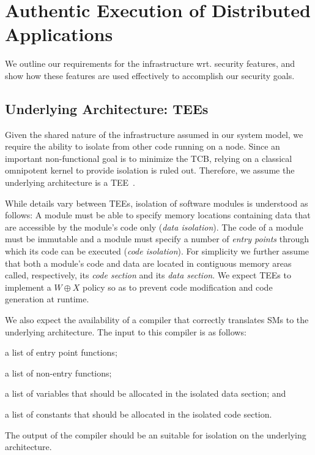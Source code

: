 \section{Authentic Execution of Distributed Applications}
\label{sec:design}

We outline our requirements for the infrastructure wrt. security features,
and show how these features are used effectively to accomplish our security
goals.

\subsection{Underlying Architecture: TEEs}
\label{design:tee}
%
Given the shared nature of the infrastructure assumed in our system model, we
require the ability to isolate \reactmods{} from other code running on a node.
Since an important non-functional goal is to minimize the \ac{TCB}, relying on a
classical omnipotent kernel to provide isolation is ruled out. Therefore, we
assume the underlying architecture is a \ac{TEE}~\cite{pma}.

\label{concept:isolation} While details vary between \acp{TEE}, isolation
of software modules is understood as follows: A module must be able to
specify memory locations containing data that are accessible by the
module's code only (\emph{data isolation}).  The code of a module must be
immutable and a module must specify a number of \emph{entry points} through
which its code can be executed (\emph{code isolation}).  For simplicity we
further assume that both a module's code and data are located in contiguous
memory areas called, respectively, its \emph{code section} and its
\emph{data section}. We expect \acp{TEE} to implement a $W\oplus X$ policy
so as to prevent code modification and code generation at runtime.

\label{concept:pma-compiler} We also expect the availability of a compiler
that correctly translates \acfp{SM} to the underlying
architecture. The input to this compiler is as follows:
%
\begin{paraenum}
%
  \item \label{compiler-input:entries} a list of entry point functions;
%
  \item \label{compiler-input:non-entries} a list of non-entry functions;
%
  \item \label{compiler-input:vars} a list of variables that should be
allocated in the isolated data section; and
%
  \item \label{compiler-input:consts} a list of constants that should be
allocated in the isolated code section.
%
\end{paraenum}
%
The output of the compiler should be an \protmod{} suitable for isolation on
the underlying architecture.

